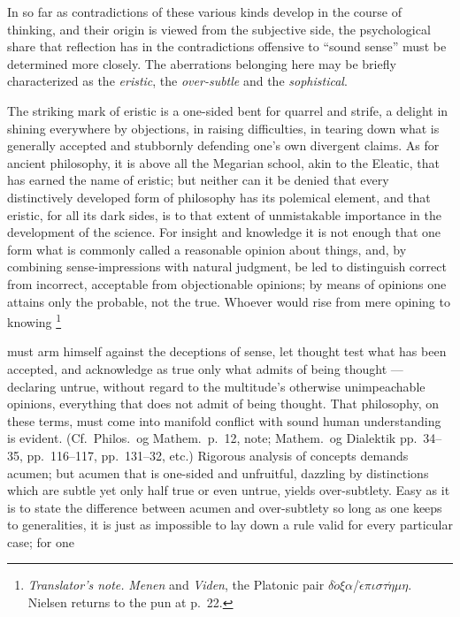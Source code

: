 \documentclass[12pt,a4paper]{book}
\renewcommand{\thefootnote}{\ifcase\value{footnote}\or *)\or **)\or ***)\fi}
\newcommand{\tnote}[1]{%
  \begingroup
  \renewcommand{\thefootnote}{\textdagger}%
  \footnote{\emph{Translator's note.} #1}%
  \addtocounter{footnote}{-1}%
  \endgroup}
\begin{document}
In so far as contradictions of these various kinds develop in the course of
thinking, and their origin is viewed from the subjective side, the
psychological share that reflection has in the contradictions offensive to
``sound sense'' must be determined more closely. The aberrations belonging here
may be briefly characterized as the \emph{eristic}, the \emph{over-subtle} and
the \emph{sophistical}.

The striking mark of eristic is a one-sided bent for quarrel and strife, a
delight in shining everywhere by objections, in raising difficulties, in
tearing down what is generally accepted and stubbornly defending one's own
divergent claims. As for ancient philosophy, it is above all the Megarian
school, akin to the Eleatic, that has earned the name of eristic; but neither
can it be denied
that every distinctively developed form of philosophy has its polemical
element, and that eristic, for all its dark sides, is to that extent of
unmistakable importance in the development of the science. For insight and
knowledge it is not enough that one form what is commonly called a reasonable
opinion about things, and, by combining sense-impressions with natural
judgment, be led to distinguish correct from incorrect, acceptable from
objectionable opinions; by means of opinions one attains only the probable, not
the true. Whoever would rise from mere opining to knowing\tnote{%
\emph{Menen} and \emph{Viden}, the Platonic pair
$\delta\acute{o}\xi\alpha$/$\dot{\epsilon}\pi\iota\sigma\tau\acute{\eta}\mu\eta$.
Nielsen returns to the pun at p.~22.} must arm himself against the deceptions
of sense, let thought test what has been accepted, and acknowledge as true only
what admits of being thought --- declaring untrue, without regard to the
multitude's otherwise unimpeachable opinions, everything that does not admit of
being thought. That philosophy, on these terms, must come into manifold
conflict with sound human understanding is evident. (Cf.\ Philos.\ og
Mathem.\ p.~12, note; Mathem.\ og Dialektik pp.~34--35, pp.~116--117,
pp.~131--32, etc.)
Rigorous analysis of concepts demands acumen; but acumen that is one-sided and
unfruitful, dazzling by distinctions which are subtle yet only half true or
even untrue, yields over-subtlety. Easy as it is to state the difference
between acumen and over-subtlety so long as one keeps to generalities, it is
just as impossible to lay down a rule valid for every particular case; for one
\end{document}
